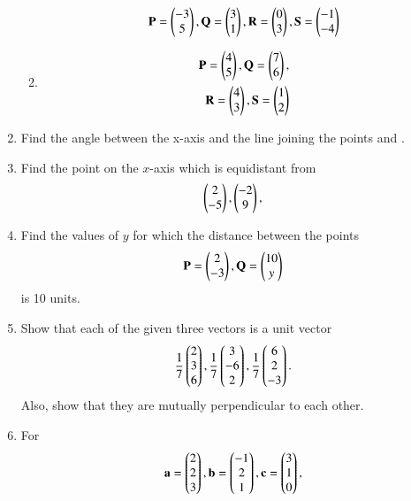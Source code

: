 \begin{enumerate}[label=\arabic*.,ref=\thesubsection.\theenumi]
\begin{enumerate}
\begin{align}
\mathbf{P} = \begin{pmatrix}-3\\5\end{pmatrix}, \mathbf{Q} =\begin{pmatrix}3\\1\end{pmatrix},
\mathbf{R} =\begin{pmatrix}0\\3\end{pmatrix}, \mathbf{S} =\begin{pmatrix}-1\\-4\end{pmatrix}
\end{align}
\item 
\begin{align}
\mathbf{P} = \begin{pmatrix}4\\5\end{pmatrix}, \mathbf{Q} =\begin{pmatrix}7\\6\end{pmatrix},
\\
\mathbf{R} =\begin{pmatrix}4\\3\end{pmatrix}, \mathbf{S} =\begin{pmatrix}1\\2\end{pmatrix}
\end{align}
\end{enumerate}
\solution

\item Find the angle between the x-axis and the line joining the points  and .
\item Find the point on the $x$-axis which is equidistant from 
\begin{align}
\begin{pmatrix}2\\-5\end{pmatrix}, \begin{pmatrix}-2\\9\end{pmatrix},
\end{align}
\solution

\item Find the values of $y$ for which the distance between the points 
\begin{align}
\mathbf{P} = \begin{pmatrix}2\\-3\end{pmatrix}, \mathbf{Q} = \begin{pmatrix}10\\y\end{pmatrix}
\end{align}
is 10 units.
\item Show that each of the given three vectors is a unit vector
\begin{align}
 \frac{1}{7}\begin{pmatrix}2\\3\\6\end{pmatrix}, \frac{1}{7}\begin{pmatrix}3\\-6\\2\end{pmatrix}, \frac{1}{7}\begin{pmatrix}6\\2\\-3\end{pmatrix}.
\end{align}
Also,  show that they are mutually perpendicular to each other.
\item For 
\begin{align}
\vec{a} = \myvec{2\\2\\3}, \vec{b} = \myvec{-1\\2\\1}, \vec{c} = \myvec{3\\1\\0},

\end{align}
\end{enumerate}
